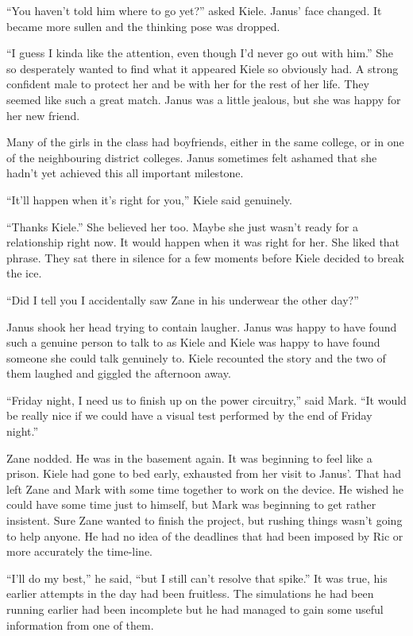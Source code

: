 ``You haven't told him where to go yet?'' asked Kiele.  Janus' face changed.  It became more sullen and the thinking pose was dropped.  

``I guess I kinda like the attention, even though I'd never go out with him.''  She so desperately wanted to find what it appeared Kiele so obviously had.  A strong confident male to protect her and be with her for the rest of her life.  They seemed like such a great match.  Janus was a little jealous, but she was happy for her new friend.

Many of the girls in the class had boyfriends, either in the same college, or in one of the neighbouring district colleges.  Janus sometimes felt ashamed that she hadn't yet achieved this all important milestone.

``It'll happen when it's right for you,'' Kiele said genuinely.

``Thanks Kiele.''  She believed her too.  Maybe she just wasn't ready for a relationship right now.  It would happen when it was right for her.  She liked that phrase.  They sat there in silence for a few moments before Kiele decided to break the ice.

``Did I tell you I accidentally saw Zane in his underwear the other day?''

Janus shook her head trying to contain laugher.  Janus was happy to have found such a genuine person to talk to as Kiele and Kiele was happy to have found someone she could talk genuinely to.  Kiele recounted the story and the two of them laughed and giggled the afternoon away.  



\thoughtbreak



 ``Friday night, I need us to finish up on the power circuitry,'' said Mark.  ``It would be really nice if we could have a visual test performed by the end of Friday night.''

Zane nodded.  He was in the basement again.  It was beginning to feel like a prison.  Kiele had gone to bed early, exhausted from her visit to Janus'.  That had left Zane and Mark with some time together to work on the device.  He wished he could have some time just to himself, but Mark was beginning to get rather insistent.  Sure Zane wanted to finish the project, but rushing things wasn't going to help anyone.  He had no idea of the deadlines that had been imposed by Ric or more accurately the time-line.  

``I'll do my best,'' he said, ``but I still can't resolve that spike.''  It was true, his earlier attempts in the day had been fruitless.  The simulations he had been running earlier had been incomplete but he had managed to gain some useful information from one of them.

